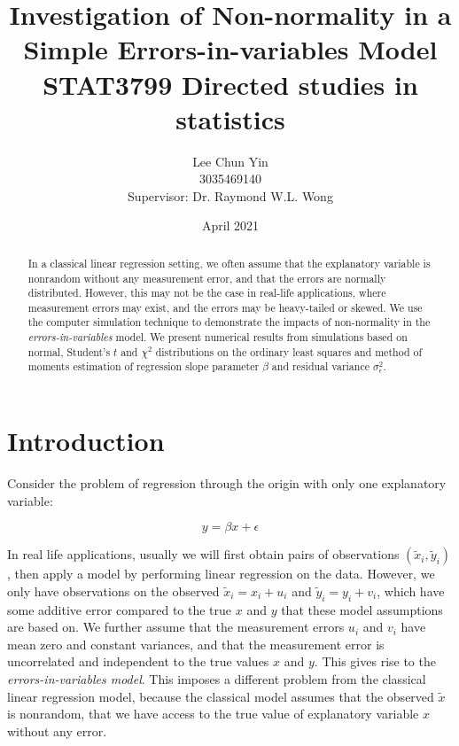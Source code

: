 \documentclass{article}
\title{Investigation of Non-normality in a Simple Errors-in-variables Model\\[1cm]
STAT3799 Directed studies in statistics}
\author{Lee Chun Yin\\
3035469140\\[1cm]{\small Supervisor: Dr. Raymond W.L. Wong}
}
\date{April 2021}
\begin{document}
\maketitle

\begin{abstract}

In a classical linear regression setting, we often assume that the explanatory variable is nonrandom without any measurement error, and that the errors are normally distributed.
However, this may not be the case in real-life applications, where measurement errors may exist, and the errors may be heavy-tailed or skewed.
We use the computer simulation technique to demonstrate the impacts of non-normality in the \textit{errors-in-variables} model.
We present numerical results from simulations based on normal, Student's $t$ and $\chi^2$ distributions on the ordinary least squares and method of moments estimation of regression slope parameter $\beta$ and residual variance $\sigma^2_\epsilon$.

\end{abstract}

\section{Introduction}

Consider the problem of regression through the origin with only one explanatory variable:

\begin{equation}
    \label{eq:model}
    y = \beta x + \epsilon
\end{equation}

In real life applications, usually we will first obtain pairs of observations $(\tilde{x}_i, \tilde{y}_i)$, then apply a model by performing linear regression on the data.
However, we only have observations on the observed $\tilde{x}_i = x_i + u_i$ and $\tilde{y}_i = y_i + v_i$, which have some additive error compared to the true $x$ and $y$ that these model assumptions are based on.
We further assume that the measurement errors $u_i$ and $v_i$ have mean zero and constant variances, and that the measurement error is uncorrelated and independent to the true values $x$ and $y$.
This gives rise to the \textit{errors-in-variables model}.
This imposes a different problem from the classical linear regression model, because the classical model assumes that the observed $\tilde{x}$ is nonrandom, that we have access to the true value of explanatory variable $x$ without any error. 
\end{document}
